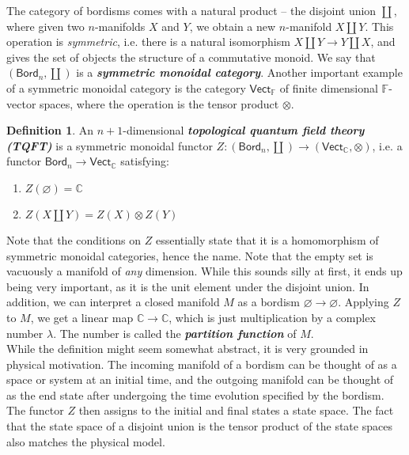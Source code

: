 \documentclass[psamsfonts, 11pt]{amsart}
\theoremstyle{definition}
\newtheorem{defn}[thm]{Definition}
\theoremstyle{remark}
\newcommand{\Bord}{\mathsf{Bord}}
\renewcommand{\emptyset}{\varnothing}
\newcommand{\ib}[1]{\textbf{\textit{#1}}}
\newcommand{\C}{\mathbb{C}}
\newcommand{\F}{\mathbb{F}}
\begin{document}
The category of bordisms comes with a natural product -- the disjoint union $\coprod$,
where given two $n$-manifolds $X$ and $Y$, we obtain a new $n$-manifold $X \coprod Y$.
This operation is \emph{symmetric}, i.e. there is a natural isomorphism
$X \coprod Y \to Y \coprod X$, and gives the set of objects the structure of a
commutative monoid. We say that $(\Bord_n, \coprod)$ is a \ib{symmetric monoidal
category}. Another important example of a symmetric monoidal category is the
category $\mathsf{Vect}_\F$ of finite dimensional $\F$-vector spaces, where the
operation is the tensor product $\otimes$.
%
\begin{defn}
An $n+1$-dimensional \ib{topological quantum field theory (TQFT)} is a symmetric
monoidal functor $Z : (\Bord_n, \coprod) \to (\mathsf{Vect}_\C, \otimes)$, i.e. a
functor $\Bord_n \to \mathsf{Vect}_\C$ satisfying:
\begin{enumerate}
  \item $Z(\emptyset) = \C$
  \item $Z(X \coprod Y) = Z(X) \otimes Z(Y)$
\end{enumerate}
\end{defn}
%
Note that the conditions on $Z$ essentially state that it is a homomorphism of symmetric
monoidal categories, hence the name. Note that the empty set is vacuously a manifold of
\emph{any} dimension. While this sounds silly at first, it ends up being very important,
as it is the unit element under the disjoint union. In addition, we can interpret a
closed manifold $M$ as a bordism $\emptyset \to \emptyset$. Applying $Z$ to $M$,
we get a linear map $\C \to \C$, which is just multiplication by a complex number
$\lambda$. The number is called the \ib{partition function} of $M$. \\

While the definition might seem somewhat abstract, it is very grounded in physical
motivation. The incoming manifold of a bordism can be thought of as a space or system at
an initial time, and the outgoing manifold can be thought of as the end state after
undergoing the time evolution specified by the bordism. The functor
$Z$ then assigns to the initial and final states a state space. The fact
that the state space of a disjoint union is the tensor product of the state spaces
also matches the physical model.
%
\end{document}
